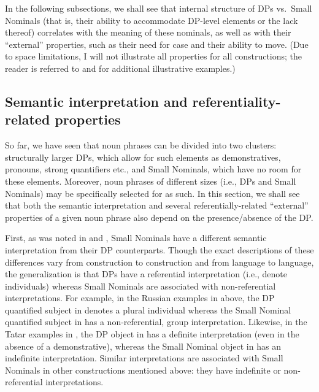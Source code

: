 \documentclass[output=paper]{langsci/langscibook}
\begin{document}
In the following subsections, we shall see that internal structure of DPs vs.~Small Nominals 
(that is, their ability to accommodate DP-level elements or the lack thereof) 
correlates with the meaning of these nominals, as well as with their “external” properties, such as their need for case and their ability to move. 
(Due to space limitations, I will not illustrate all properties for all constructions; 
the reader is referred to \citealt{Pereltsvaig2006} and \citealt{LyutikovaPereltsvaig2015} for additional illustrative examples.)

\subsection{Semantic interpretation and referentiality-related properties}  %

So far, we have seen that noun phrases can be divided into two clusters: 
structurally larger DPs, which allow for such elements as demonstratives, pronouns, strong quantifiers etc., 
and Small Nominals, which have no room for these elements. 
Moreover, noun phrases of different sizes (i.e., DPs and Small Nominals) may be specifically selected for as such. 
In this section, we shall see that both the semantic interpretation and several referentially-related “external” properties of a given noun phrase 
also depend on the presence/absence of the DP.

First, as was noted in \citet{Pereltsvaig2006} and \citet{LyutikovaPereltsvaig2015}, 
Small Nominals have a different semantic interpretation from their DP counterparts. 
Though the exact descriptions of these differences vary from construction to construction and from language to language, 
the generalization is that DPs have a referential interpretation (i.e., denote individuals) 
whereas Small Nominals are associated with non-referential interpretations. 
For example, in the Russian examples in  above, the DP quantified subject in  denotes a plural individual 
whereas the Small Nominal quantified subject in  has a non-referential, group interpretation. 
Likewise, in the Tatar examples in , the DP object in  has a definite interpretation (even in the absence of a demonstrative), 
whereas the Small Nominal object in  has an indefinite interpretation. 
Similar interpretations are associated with Small Nominals in other constructions mentioned above: 
they have indefinite or non-referential interpretations.
\end{document}
